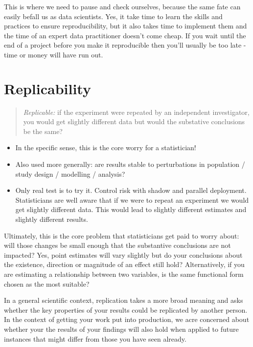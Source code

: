 \documentclass[
  letterpaper,
  DIV=11,
  numbers=noendperiod]{scrreprt}
\begin{document}
This is where we need to pause and check ourselves, because the same
fate can easily befall us as data scientists. Yes, it take time to learn
the skills and practices to ensure reproducibility, but it also takes
time to implement them and the time of an expert data practitioner
doesn't come cheap. If you wait until the end of a project before you
make it reproducible then you'll usually be too late - time or money
will have run out.

\section{Replicability}\label{replicability}

\begin{quote}
\emph{Replicable:} if the experiment were repeated by an independent
investigator, you would get slightly different data but would the
substative conclusions be the same?
\end{quote}

\begin{itemize}
\item
  In the specific sense, this is the core worry for a statistician!
\item
  Also used more generally: are results stable to perturbations in
  population / study design / modelling / analysis?
\item
  Only real test is to try it. Control risk with shadow and parallel
  deployment. Statisticians are well aware that if we were to repeat an
  experiment we would get slightly different data. This would lead to
  slightly different estimates and slightly different results.
\end{itemize}

Ultimately, this is the core problem that statisticians get paid to
worry about: will those changes be small enough that the substantive
conclusions are not impacted? Yes, point estimates will vary slightly
but do your conclusions about the existence, direction or magnitude of
an effect still hold? Alternatively, if you are estimating a
relationship between two variables, is the same functional form chosen
as the most suitable?

In a general scientific context, replication takes a more broad meaning
and asks whether the key properties of your results could be replicated
by another person. In the context of getting your work put into
production, we acre concerned about whether your the results of your
findings will also hold when applied to future instances that might
differ from those you have seen already.
\end{document}
